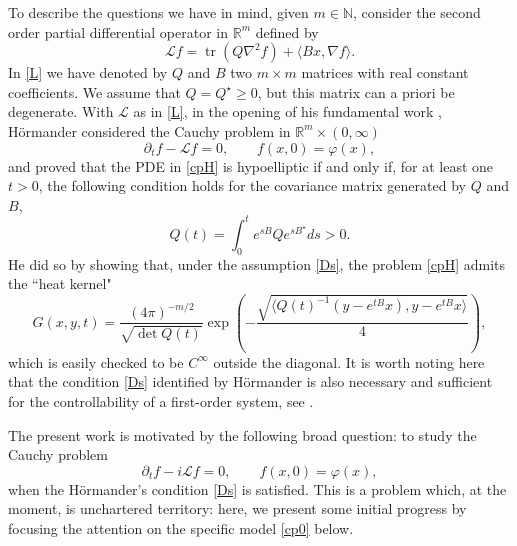 \documentclass[11pt,a4paper]{amsart}
\def \vf{\varphi}
\newcommand{\Rm}{\mathbb R^m}
\newcommand{\p}{\partial}
\numberwithin{equation}{section}
\numberwithin{equation}{section}
\begin{document}
To describe the questions we have in mind, given $m\in \mathbb N$, consider  the second order partial differential operator in $\Rm$ defined by 
\begin{equation}\label{L}
\mathscr L f = \operatorname{tr}(Q \nabla^2 f) +  \langle B x,\nabla f\rangle.
\end{equation}
In \eqref{L} we have denoted by $Q$ and $B$ two $m\times m$ matrices with real constant coefficients. We assume that $Q = Q^\star \ge 0$, but this matrix can a priori be degenerate. With $\mathscr L$ as in \eqref{L}, in the opening of his fundamental work \cite{Ho}, H\"ormander considered the  Cauchy problem  in $\Rm\times (0,\infty)$
\begin{equation}\label{cpH}
\p_t f -  \mathscr L f = 0,\ \ \ \ \ \ \ \ \ f(x,0) = \vf(x),
\end{equation}
and proved that the PDE in \eqref{cpH} is hypoelliptic if and only if, for at least one $t>0$, the following condition holds for the covariance matrix generated by $Q$ and $B$,
\begin{equation}\label{Ds}
Q(t) = \int_0^t e^{sB}Q e^{sB^\star} ds > 0.
\end{equation}
He did so by showing that, under the assumption \eqref{Ds}, the problem \eqref{cpH} admits the ``heat kernel" 
\begin{equation}\label{q}
G(x,y,t) = \frac{(4\pi)^{-m/2}}{\sqrt{\det Q(t)}} \exp\left( -
\frac{\sqrt{\langle Q(t)^{-1}(y-e^{tB} x),y-e^{tB}
x \rangle}}{4}\right),
\end{equation}
which is easily checked to be $C^\infty$ outside the diagonal. It is worth noting here that the condition \eqref{Ds} identified by H\"ormander is also necessary and sufficient for the controllability of a first-order system, see \cite{Z}.

The present work is motivated by the following broad question: to study the Cauchy problem 
\begin{equation}\label{cpHi}
\p_t f -  i \mathscr L f = 0,\ \ \ \ \ \ \ \ \ f(x,0) = \vf(x),
\end{equation}
when the H\"ormander's condition \eqref{Ds} is satisfied. This is a problem which, at the moment, is unchartered territory: here, we present some initial progress by focusing the attention on the specific model \eqref{cp0} below. 
\end{document}
